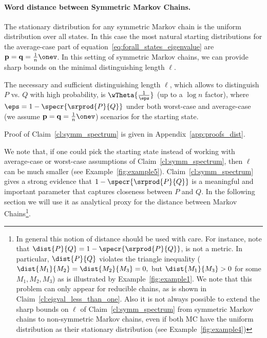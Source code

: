 \paragraph{Word distance between Symmetric Markov Chains.} The stationary distribution for any symmetric Markov chain is the uniform distribution over all states. 
In this case the most natural starting distributions for the average-case part of equation~\eqref{eq:forall_states_eigenvalue} are $\vect{p}=\vect{q}=\frac{1}{n}\onev$.
In this setting of symmetric Markov chains, we can provide sharp bounds on the minimal distinguishing length $\ell$.
\begin{claim}
The necessary and sufficient distinguishing length $\ell$, which allows to distinguish $P$ vs. $Q$ with high probability, 
is $\wTheta{\frac{1}{\eps}}$ (up to a $\log n$ factor), where $\eps=1-\specr{\srprod{P}{Q}}$ under both worst-case and average-case (we assume
$\vect{p}=\vect{q}=\frac{1}{n}\onev$) scenarios for the starting state.
\label{cl:symm_spectrum}
\end{claim}
Proof of Claim~\ref{cl:symm_spectrum} is given in Appendix~\ref{app:proofs_dist}.

We note that, if one could pick the starting state instead of working with average-case or worst-case assumptions of Claim~\ref{cl:symm_spectrum}, then $\ell$ can be much smaller (see Example~\ref{fig:example5}). Claim~\ref{cl:symm_spectrum} gives a strong evidence that $1-\specr{\srprod{P}{Q}}$ 
is a meaningful and important parameter that captures closeness between $P$ and $Q$. In the following section we will use it as analytical proxy for the distance between 
Markov Chains\footnote{In general this notion of distance should be used with care. For instance, note that $\dist{P}{Q}=1-\specr{\srprod{P}{Q}}$, is not a metric. In particular, $
\dist{P}{Q}$ violates the triangle inequality ($\dist{M_1}{M_2}=\dist{M_2}{M_3}=0,$ but $\dist{M_1}{M_3}>0$ for some $M_1,M_2,M_3$) as is illustrated by Example~\ref{fig:example1}. 
We note that this problem can only appear for reducible chains, as is shown in Claim~\ref{cl:eigval_less_than_one}. Also it is not always possible to extend the sharp bounds on $\ell$ of 
Claim~\ref{cl:symm_spectrum} from symmetric Markov chains to non-symmetric Markov chains, even if both MC have the uniform distribution as their stationary distribution (see Example~\ref{fig:example4})
}.





